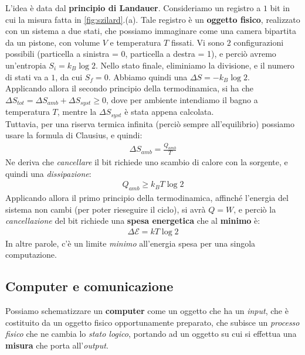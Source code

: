 \documentclass[../../InformazioneQuantistica.tex]{subfiles}
\begin{document}
L'idea è data dal \textbf{principio di Landauer}. Consideriamo un registro a $1$ bit in cui  la misura fatta in \ref{fig:szilard}.(a). Tale registro è un \textbf{oggetto fisico}, realizzato con un sistema a due stati, che possiamo immaginare come una camera bipartita da un pistone, con volume $V$ e temperatura $T$ fissati. Vi sono $2$ configurazioni possibili (particella a sinistra = 0, particella a destra = 1), e perciò avremo un'entropia $S_i = k_B \log 2$. Nello stato finale, eliminiamo la divisione, e il numero di stati va a $1$, da cui $S_f = 0$. Abbiamo quindi una $\Delta S = -k_B \log 2$.\\
Applicando allora il secondo principio della termodinamica, si ha che $\Delta S_{tot} = \Delta S_{amb} + \Delta S_{syst} \geq 0$, dove per ambiente intendiamo il bagno a temperatura $T$, mentre la $\Delta S_{syst}$ è stata appena calcolata.\\
Tuttavia, per una riserva termica infinita (perciò sempre all'equilibrio) possiamo usare la formula di Clausius, e quindi:
\begin{align*}
\Delta S_{amb} =\frac{Q_{amb}}{T}
\end{align*}
Ne deriva che \textit{cancellare} il bit richiede uno scambio di calore con la sorgente, e quindi una \textit{dissipazione}:
\begin{align*}
Q_{amb} \geq k_B T \log 2
\end{align*}
Applicando allora il primo principio della termodinamica, affinché l'energia del sistema non cambi (per poter rieseguire il ciclo), si avrà $Q=W$, e perciò la \textit{cancellazione} del bit richiede una \textbf{spesa energetica} che al \textbf{minimo} è: 
\begin{align*}
\Delta \mathcal{E} = kT \log 2 
\end{align*}
In altre parole, c'è un limite \textit{minimo} all'energia spesa per una singola computazione.

\subsection{Computer e comunicazione}

Possiamo schematizzare un \textbf{computer} come un oggetto che ha un \textit{input}, che è costituito da un oggetto fisico opportunamente preparato, che subisce un \textit{processo fisico} che ne cambia lo \textit{stato logico}, portando ad un oggetto su cui si effettua una \textbf{misura} che porta all'\textit{output}.\\
\end{document}
